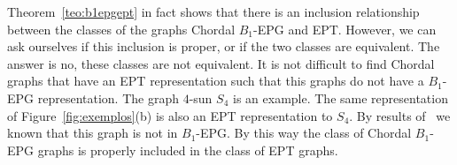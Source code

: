 \documentclass[9pt]{entcs}
\newtheorem{lema}{Lemma}[section]
\newtheorem{defi}{Definition}[section]
\begin{document}
Theorem~\ref{teo:b1epgept} in fact shows that there is an inclusion relationship between the classes of the graphs Chordal $B_1$-EPG and EPT. However, we can ask ourselves if this inclusion is proper, or if the two classes are equivalent. The answer is no, these classes are not equivalent. It is not difficult to find Chordal graphs that have an  EPT representation such that this graphs do not have a $B_1$-EPG representation. The graph $4$-sun $S_4$ is an example. The same representation of Figure~\ref{fig:exemplos}(b) is also  an EPT representation to $S_4$. By results of~\cite{golumbic2009} we known that this graph is not in $B_1$-EPG. By this way the class of Chordal $B_1$-EPG graphs is properly included in the class of EPT graphs.   





\end{document}
